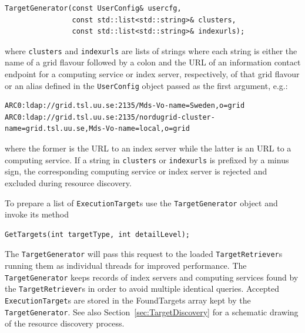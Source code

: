 \documentclass{book}
\newcommand{\ExecutionTarget}{\texttt{ExecutionTarget}}
\newcommand{\TargetGenerator}{\texttt{TargetGenerator}}
\newcommand{\TargetRetriever}{\texttt{TargetRetriever}}
\newcommand{\UserConfig}{\texttt{UserConfig}}
\begin{document}
\begin{shaded}
\begin{verbatim}
TargetGenerator(const UserConfig& usercfg,
                const std::list<std::string>& clusters,
                const std::list<std::string>& indexurls);
\end{verbatim}
\end{shaded}

where \texttt{clusters} and \texttt{indexurls} are lists of strings
where each string is either the name of a grid flavour followed by a
colon and the URL of an information contact endpoint for a computing
service or index server, respectively, of that grid flavour or an
alias defined in the {\UserConfig} object passed as the first
argument, e.g.:

\begin{shaded}
\begin{small}
\begin{verbatim}
ARC0:ldap://grid.tsl.uu.se:2135/Mds-Vo-name=Sweden,o=grid
ARC0:ldap://grid.tsl.uu.se:2135/nordugrid-cluster-name=grid.tsl.uu.se,Mds-Vo-name=local,o=grid
\end{verbatim}
\end{small}
\end{shaded}

where the former is the URL to an index server while the latter is an
URL to a computing service. If a string in \texttt{clusters} or
\texttt{indexurls} is prefixed by a minus sign, the corresponding
computing service or index server is rejected and excluded during
resource discovery.

To prepare a list of {\ExecutionTarget}s use the {\TargetGenerator}
object and invoke its method

\begin{shaded}
\begin{verbatim}
GetTargets(int targetType, int detailLevel);
\end{verbatim}
\end{shaded}

The {\TargetGenerator} will pass this request to the loaded
{\TargetRetriever}s running them as individual threads for improved
performance. The {\TargetGenerator} keeps records of index servers and
computing services found by the {\TargetRetriever}s in order to avoid
multiple identical queries. Accepted {\ExecutionTarget}s are stored in
the FoundTargets array kept by the {\TargetGenerator}. See also
Section~\ref{sec:TargetDiscovery} for a schematic drawing of the
resource discovery process.
\end{document}
